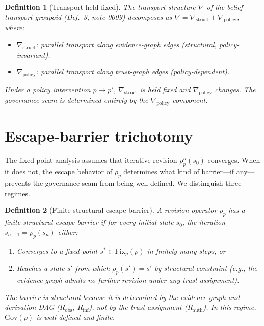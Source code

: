 \documentclass[11pt]{article}
\newtheorem{definition}{Definition}
\newcommand{\Gov}{\mathrm{Gov}}
\newcommand{\Fix}{\mathrm{Fix}}
\newcommand{\Robs}{R_{\mathrm{obs}}}
\newcommand{\Rinf}{R_{\mathrm{inf}}}
\newcommand{\Rauth}{R_{\mathrm{auth}}}
\begin{document}
\begin{definition}[Transport held fixed]
\label{def:transport-fixed}
The \emph{transport structure} $\nabla$ of the belief-transport groupoid (Def.~3, note 0009)
decomposes as $\nabla = \nabla_{\mathrm{struct}} + \nabla_{\mathrm{policy}}$, where:
\begin{itemize}
  \item $\nabla_{\mathrm{struct}}$: parallel transport along evidence-graph edges (structural,
        policy-invariant).
  \item $\nabla_{\mathrm{policy}}$: parallel transport along trust-graph edges (policy-dependent).
\end{itemize}
Under a policy intervention $p \to p'$, $\nabla_{\mathrm{struct}}$ is held fixed and
$\nabla_{\mathrm{policy}}$ changes. The governance seam is determined entirely by the
$\nabla_{\mathrm{policy}}$ component.
\end{definition}

\section{Escape-barrier trichotomy}
\label{sec:escape}

The fixed-point analysis assumes that iterative revision $\rho_p^n(s_0)$ converges. When it
does not, the escape behavior of $\rho_p$ determines what kind of barrier---if any---prevents
the governance seam from being well-defined. We distinguish three regimes.

\begin{definition}[Finite structural escape barrier]
\label{def:finite-escape}
A revision operator $\rho_p$ has a \emph{finite structural escape barrier} if for every initial
state $s_0$, the iteration $s_{n+1} = \rho_p(s_n)$ either:
\begin{enumerate}
  \item Converges to a fixed point $s^* \in \Fix_p(\rho)$ in finitely many steps, or
  \item Reaches a state $s'$ from which $\rho_p(s') = s'$ by structural constraint (e.g., the
        evidence graph admits no further revision under any trust assignment).
\end{enumerate}
The barrier is \emph{structural} because it is determined by the evidence graph and derivation
DAG ($\Robs$, $\Rinf$), not by the trust assignment ($\Rauth$). In this regime, $\Gov(\rho)$
is well-defined and finite.
\end{definition}
\end{document}
